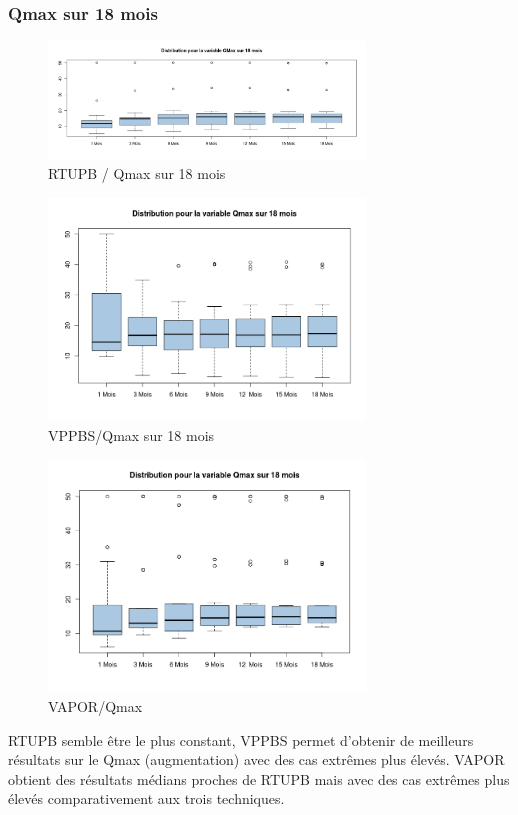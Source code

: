 %
%

\subsubsection{Qmax sur 18 mois }

\begin{figure}[H]
\centering
\includegraphics[width=0.75\textwidth]{../Fig/RTUPB/rtupb-boxplot-post-Qmax}
\caption{RTUPB / Qmax sur 18 mois}
\end{figure}	
	
\begin{figure}[H]
\centering
\includegraphics[width=0.75\textwidth]{../Fig/VPPBS/vppbs-boxplot-post-Qmax}
\caption{VPPBS/Qmax sur 18 mois}
\end{figure}


\begin{figure}[H]
\centering
\includegraphics[width=0.75\textwidth]{../Fig/VAPOR/vapor-boxplot-post-Qmax}
\caption{VAPOR/Qmax}
\end{figure}

%

RTUPB semble être le plus constant, VPPBS permet d’obtenir de meilleurs résultats sur le Qmax (augmentation) avec des cas extrêmes plus élevés. VAPOR obtient des résultats médians proches de RTUPB mais avec des cas extrêmes plus élevés comparativement aux trois techniques.   